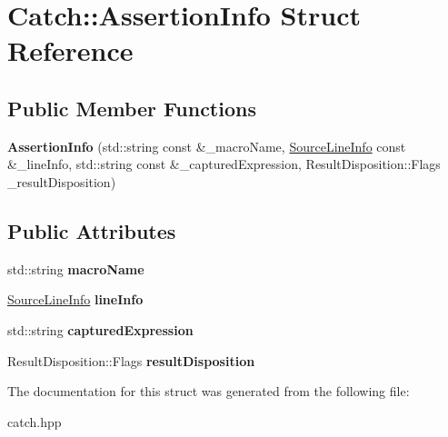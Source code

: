 \hypertarget{structCatch_1_1AssertionInfo}{
\section{Catch::AssertionInfo Struct Reference}
\label{structCatch_1_1AssertionInfo}
}
\subsection*{Public Member Functions}
\begin{DoxyCompactItemize}
\item 
\hypertarget{structCatch_1_1AssertionInfo_aaf6cc3eebd40391e54d37ed42953c73f}{
{\bfseries AssertionInfo} (std::string const \&\_\-macroName, \hyperlink{structCatch_1_1SourceLineInfo}{SourceLineInfo} const \&\_\-lineInfo, std::string const \&\_\-capturedExpression, ResultDisposition::Flags \_\-resultDisposition)}
\label{structCatch_1_1AssertionInfo_aaf6cc3eebd40391e54d37ed42953c73f}

\end{DoxyCompactItemize}
\subsection*{Public Attributes}
\begin{DoxyCompactItemize}
\item 
\hypertarget{structCatch_1_1AssertionInfo_ac2e59e8c89e00eb3390768f50d540b18}{
std::string {\bfseries macroName}}
\label{structCatch_1_1AssertionInfo_ac2e59e8c89e00eb3390768f50d540b18}

\item 
\hypertarget{structCatch_1_1AssertionInfo_a17bdbb404ba12658034f833be2f4c3e7}{
\hyperlink{structCatch_1_1SourceLineInfo}{SourceLineInfo} {\bfseries lineInfo}}
\label{structCatch_1_1AssertionInfo_a17bdbb404ba12658034f833be2f4c3e7}

\item 
\hypertarget{structCatch_1_1AssertionInfo_af7c1d3cbfa346e9a303030fa0ef0cb54}{
std::string {\bfseries capturedExpression}}
\label{structCatch_1_1AssertionInfo_af7c1d3cbfa346e9a303030fa0ef0cb54}

\item 
\hypertarget{structCatch_1_1AssertionInfo_a60353b3632ab2f827162f2b2d6911073}{
ResultDisposition::Flags {\bfseries resultDisposition}}
\label{structCatch_1_1AssertionInfo_a60353b3632ab2f827162f2b2d6911073}

\end{DoxyCompactItemize}


The documentation for this struct was generated from the following file:\begin{DoxyCompactItemize}
\item 
catch.hpp\end{DoxyCompactItemize}
